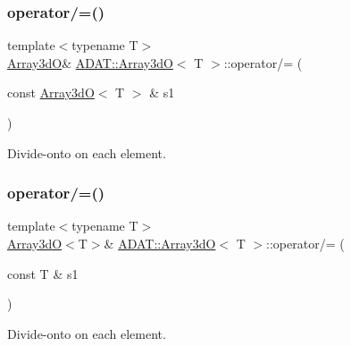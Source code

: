 \subsubsection{\texorpdfstring{operator/=()}{operator/=()}\hspace{0.1cm}{\footnotesize\ttfamily [2/4]}}
{\footnotesize\ttfamily template$<$typename T$>$ \\
\mbox{\hyperlink{classADAT_1_1Array3dO}{Array3dO}}\& \mbox{\hyperlink{classADAT_1_1Array3dO}{A\+D\+A\+T\+::\+Array3dO}}$<$ T $>$\+::operator/= (\begin{DoxyParamCaption}\item[{const \mbox{\hyperlink{classADAT_1_1Array3dO}{Array3dO}}$<$ T $>$ \&}]{s1 }\end{DoxyParamCaption})\hspace{0.3cm}{\ttfamily [inline]}}



Divide-\/onto on each element. 

\mbox{\label{classADAT_1_1Array3dO_a9d82ba391c67603f43b112c945532de6}} 
\subsubsection{\texorpdfstring{operator/=()}{operator/=()}\hspace{0.1cm}{\footnotesize\ttfamily [3/4]}}
{\footnotesize\ttfamily template$<$typename T$>$ \\
\mbox{\hyperlink{classADAT_1_1Array3dO}{Array3dO}}$<$T$>$\& \mbox{\hyperlink{classADAT_1_1Array3dO}{A\+D\+A\+T\+::\+Array3dO}}$<$ T $>$\+::operator/= (\begin{DoxyParamCaption}\item[{const T \&}]{s1 }\end{DoxyParamCaption})\hspace{0.3cm}{\ttfamily [inline]}}



Divide-\/onto on each element. 

\mbox{\label{classADAT_1_1Array3dO_a9d82ba391c67603f43b112c945532de6}} 
